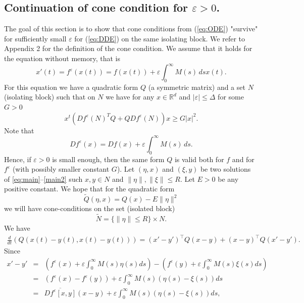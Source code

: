 \documentclass[11pt, leqno]{amsart}
\theoremstyle{definition}
\begin{document}
\subsection{Continuation of cone condition for $\varepsilon>0$.}
\label{subsec:coneCond}
The goal of this section is to show that  cone conditions from (\ref{eq:ODE}) "survive" for sufficiently small $\varepsilon$ for (\ref{eq:DDE}) on the same isolating block. We refer to Appendix 2 for the definition of the cone condition. We assume that it holds for  the equation without memory, that is
$$
x'(t) = f^\varepsilon (x(t)) = f(x(t)) + \varepsilon \int_0^\infty M(s)\, ds x(t).
$$
For this equation we have a quadratic form $Q$  (a symmetric matrix) and a set $N$ (isolating block) such that
on $N$ we have for any $x \in \mathbb{R}^d $ and $|\varepsilon| \leq \Delta$ for some $G>0$
\begin{equation}
	x^t(Df^\varepsilon(N)^TQ + Q Df^\varepsilon(N))x \geq  G |x|^2.
\end{equation}
Note that
$$
Df^\varepsilon(x) = Df(x) + \varepsilon \int_0^\infty M(s)\, ds.
$$
 Hence, if $\varepsilon>0$ is small enough, then the same form $Q$ is valid both for $f$ and for $f^\varepsilon$ (with possibly smaller constant $G$).
Let $(\eta,x)$ and $(\xi,y)$ be two solutions of \eqref{eq:main}--\eqref{main2} such $x,y \in N$ and $\|\eta\|, \|\xi\|\leq R$.
Let $E>0$ be any positive constant. We hope that for the quadratic form
\begin{equation}
	\widetilde{Q}(\eta,x)=Q(x) -  E \|\eta\|^2  \label{eq:tildeQ-new}
\end{equation}
we will have cone-conditions on the set (isolated block)
\begin{equation}
	\widetilde{N}= \{\|\eta \| \leq R\}\times N.
\end{equation}
We have
\begin{eqnarray*}
	\frac{d}{dt} \left( Q(x(t)-y(t),x(t)-y(t))  \right) =
	(x'-y')^\top Q (x-y) +  (x-y)^\top Q (x'-y').
\end{eqnarray*}
Since
\begin{eqnarray*}
	x'-y'&=&\left(f^\varepsilon(x) + \varepsilon \int_0^\infty M(s)\eta(s)ds \right)
	-\left(f^\varepsilon(y)+ \varepsilon \int_0^\infty M(s)\xi(s)ds\right) \\
	&=&(f^\varepsilon(x) - f^\varepsilon(y))  + \varepsilon \int_0^\infty M(s) (\eta(s) - \xi(s))ds \\
	&=&  \overline{Df^\varepsilon [x,y]}(x - y)  + \varepsilon \int_0^\infty M(s) (\eta(s) - \xi(s))ds,
\end{eqnarray*}
\end{document}
